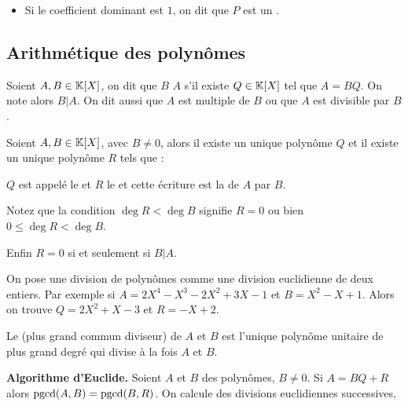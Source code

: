 \documentclass[10pt,class=article,crop=false]{standalone}
\begin{document}
\begin{multicols}{2}
\begin{itemize}
	\item Si le coefficient dominant est $1$, on dit que $P$ est un .
\end{itemize}


\subsection{Arithmétique des polynômes}



Soient $A,B \in\mathbb{K}[X]$, on dit que $B$  $A$ s'il existe  $Q\in\mathbb{K}[X]$ tel que $A=BQ$.
On note alors $B|A$.
On dit aussi que $A$ est multiple de $B$ ou que $A$ est divisible par $B$.

\begin{theoreme}
	Soient $A,B \in\mathbb{K}[X]$, avec $B \neq 0$, alors il existe un
	unique polynôme $Q$ et il existe un unique polynôme $R$ tels que :
\end{theoreme}

$Q$ est appelé le  et $R$ le  et cette écriture
est la  de $A$ par $B$.

Notez que la condition $\deg R < \deg B$ signifie $R=0$
ou bien $0 \le \deg R < \deg B$.

Enfin $R=0$ si et seulement si $B|A$.


\begin{exemple}
	On pose une division de polynômes comme une division euclidienne de deux entiers.
	Par exemple si $A=2X^4-X^3-2X^2+3X-1$ et $B=X^2-X+1$.
	Alors on trouve $Q= 2X^2+X-3$ et $R=-X+2$.
	
	
\end{exemple}

Le  (plus grand commun diviseur) de $A$ et $B$
est l'unique polynôme unitaire de plus grand degré qui
divise à la fois $A$ et $B$.





\textbf{Algorithme d'Euclide.}
Soient $A$ et $B$ des polynômes, $B \neq 0$.
Si $A=BQ+R$ alors $\mathop{\text{pgcd}}(A,B) = \mathop{\text{pgcd}}(B,R)$.
On calcule des divisions euclidiennes successives,


\end{multicols}
\end{document}
